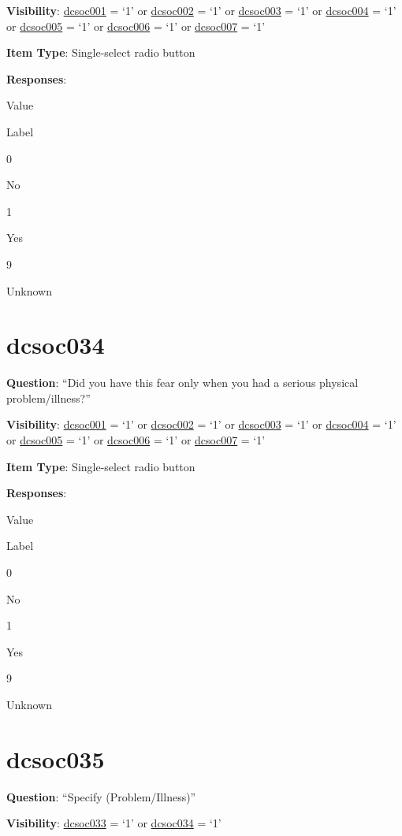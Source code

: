 \documentclass[]{book}
\begin{document}
\textbf{Visibility}: \protect\hyperlink{dcsoc001}{dcsoc001} = `1' or \protect\hyperlink{dcsoc002}{dcsoc002} = `1' or \protect\hyperlink{dcsoc003}{dcsoc003} = `1' or \protect\hyperlink{dcsoc004}{dcsoc004} = `1' or \protect\hyperlink{dcsoc005}{dcsoc005} = `1' or \protect\hyperlink{dcsoc006}{dcsoc006} = `1' or \protect\hyperlink{dcsoc007}{dcsoc007} = `1'

\textbf{Item Type}: Single-select radio button

\textbf{Responses}:

Value

Label

0

No

1

Yes

9

Unknown

\hypertarget{dcsoc034}{%
\section{dcsoc034}\label{dcsoc034}}

\textbf{Question}: ``Did you have this fear only when you had a serious physical problem/illness?''

\textbf{Visibility}: \protect\hyperlink{dcsoc001}{dcsoc001} = `1' or \protect\hyperlink{dcsoc002}{dcsoc002} = `1' or \protect\hyperlink{dcsoc003}{dcsoc003} = `1' or \protect\hyperlink{dcsoc004}{dcsoc004} = `1' or \protect\hyperlink{dcsoc005}{dcsoc005} = `1' or \protect\hyperlink{dcsoc006}{dcsoc006} = `1' or \protect\hyperlink{dcsoc007}{dcsoc007} = `1'

\textbf{Item Type}: Single-select radio button

\textbf{Responses}:

Value

Label

0

No

1

Yes

9

Unknown

\hypertarget{dcsoc035}{%
\section{dcsoc035}\label{dcsoc035}}

\textbf{Question}: ``Specify (Problem/Illness)''

\textbf{Visibility}: \protect\hyperlink{dcsoc033}{dcsoc033} = `1' or \protect\hyperlink{dcsoc034}{dcsoc034} = `1'
\end{document}
